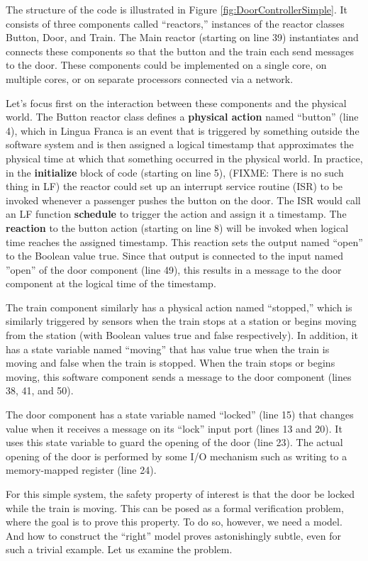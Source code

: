 \documentclass{article}
\begin{document}
The structure of the code is illustrated in Figure \ref{fig:DoorControllerSimple}.
It consists of three components called ``reactors,'' instances of the reactor classes
Button, Door, and Train. The Main reactor (starting on line 39) instantiates and connects these
components so that the button and the train each send messages to the door.
These components could be implemented on a single core, on multiple cores, or on
separate processors connected via a network.

Let's focus first on the interaction between these components and the physical world.
The Button reactor class defines a \textbf{physical action} named ``button'' (line 4), which in Lingua Franca is an event
that is triggered by something outside the software system and is then assigned a logical timestamp
that approximates the physical time at which that something occurred in the physical world.
In practice, in the \textbf{initialize} block of code (starting on line 5),
(FIXME: There is no such thing in LF)
the reactor could set
up an interrupt service routine (ISR) to be invoked whenever a passenger pushes the button on the door.
The ISR would call an LF function \textbf{schedule} to trigger the action and assign it a timestamp.
The \textbf{reaction} to the button action (starting on line 8) will be invoked when logical time reaches
the assigned timestamp.
This reaction sets the output named ``open'' to the Boolean value true.
Since that output is connected to the input named ''open'' of the door component (line 49),
this results in a message to the door component at the logical time of the timestamp.

The train component similarly has a physical action named ``stopped,''
which is similarly triggered by sensors when the train stops at a station or
begins moving from the station (with Boolean values true and false respectively).
In addition, it has a state variable named ``moving'' that has value true when the train is moving
and false when the train is stopped.
When the train stops or begins moving, this software component sends a message to the
door component (lines 38, 41, and 50).

The door component has a state variable named ``locked'' (line 15) that changes value  when it receives a message
on its ``lock'' input port (lines 13 and 20).
It uses this state variable to guard the opening of the door (line 23).
The actual opening of the door is performed by some I/O mechanism such as writing to a memory-mapped
register (line 24).

For this simple system, the safety property of interest is that the door be locked while the train is moving.
This can be posed as a formal verification problem, where the goal is to prove this property.
To do so, however, we need a model.
And how to construct the ``right'' model proves astonishingly subtle,
even for such a trivial example.
Let us examine the problem.
\end{document}
